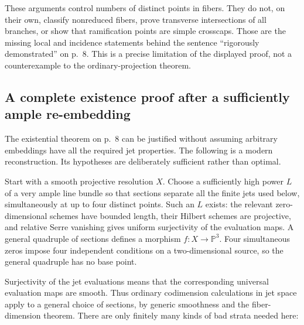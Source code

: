 These arguments control numbers of distinct points in fibers. They do not, on their own, classify nonreduced fibers, prove transverse intersections of all branches, or show that ramification points are simple crosscaps. Those are the missing local and incidence statements behind the sentence ``rigorously demonstrated'' on p.~8. This is a precise limitation of the displayed proof, not a counterexample to the ordinary-projection theorem.

\subsection{A complete existence proof after a sufficiently ample re-embedding}

The existential theorem on p.~8 can be justified without assuming arbitrary embeddings have all the required jet properties. The following is a modern reconstruction. Its hypotheses are deliberately sufficient rather than optimal.

Start with a smooth projective resolution \(X\). Choose a sufficiently high power \(L\) of a very ample line bundle so that sections separate all the finite jets used below, simultaneously at up to four distinct points. Such an \(L\) exists: the relevant zero-dimensional schemes have bounded length, their Hilbert schemes are projective, and relative Serre vanishing gives uniform surjectivity of the evaluation maps. A general quadruple of sections defines a morphism \(f:X\to\mathbb P^3\). Four simultaneous zeros impose four independent conditions on a two-dimensional source, so the general quadruple has no base point.

Surjectivity of the jet evaluations means that the corresponding universal evaluation maps are smooth. Thus ordinary codimension calculations in jet space apply to a general choice of sections, by generic smoothness and the fiber-dimension theorem. There are only finitely many kinds of bad strata needed here:


